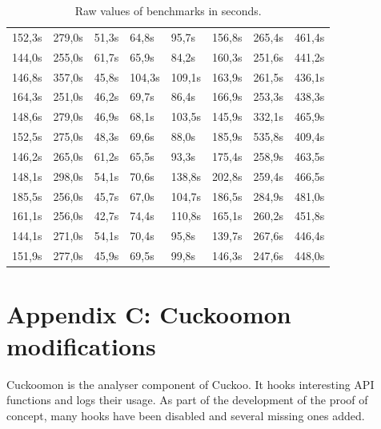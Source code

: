 \documentclass{scrartcl}
\begin{document}
\begin{table}[h]
\begin{tabular}{@{}llllllll@{}}
152,3s  & 279,0s  & 51,3s       & 64,8s       & 95,7s        & 156,8s       & 265,4s       & 461,4s        \\
144,0s  & 255,0s  & 61,7s       & 65,9s       & 84,2s        & 160,3s       & 251,6s       & 441,2s        \\
146,8s  & 357,0s  & 45,8s       & 104,3s      & 109,1s       & 163,9s       & 261,5s       & 436,1s        \\
164,3s  & 251,0s  & 46,2s       & 69,7s       & 86,4s        & 166,9s       & 253,3s       & 438,3s        \\
148,6s  & 279,0s  & 46,9s       & 68,1s       & 103,5s       & 145,9s       & 332,1s       & 465,9s        \\
152,5s  & 275,0s  & 48,3s       & 69,6s       & 88,0s        & 185,9s       & 535,8s       & 409,4s        \\
146,2s  & 265,0s  & 61,2s       & 65,5s       & 93,3s        & 175,4s       & 258,9s       & 463,5s        \\
148,1s  & 298,0s  & 54,1s       & 70,6s       & 138,8s       & 202,8s       & 259,4s       & 466,5s        \\
185,5s  & 256,0s  & 45,7s       & 67,0s       & 104,7s       & 186,5s       & 284,9s       & 481,0s        \\
161,1s  & 256,0s  & 42,7s       & 74,4s       & 110,8s       & 165,1s       & 260,2s       & 451,8s        \\
144,1s  & 271,0s  & 54,1s       & 70,4s       & 95,8s        & 139,7s       & 267,6s       & 446,4s        \\
151,9s  & 277,0s  & 45,9s       & 69,5s       & 99,8s        & 146,3s       & 247,6s       & 448,0s        \\ \bottomrule
\end{tabular}
\caption{Raw values of benchmarks in seconds.}
\label{my-label}
\end{table}

\clearpage

\section*{Appendix C: Cuckoomon modifications}
\label{cuckoomonmods}

Cuckoomon is the analyser component of Cuckoo. It hooks interesting API functions and logs their usage. As part of the development of the proof of concept, many hooks have been disabled and several missing ones added.
\end{document}
